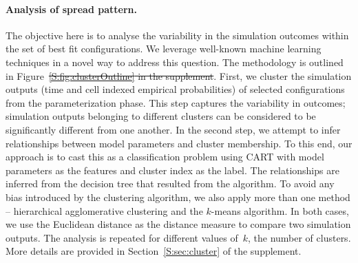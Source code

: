\documentclass[11pt]{article}
\theoremstyle{definition}
\providecommand{\DIFaddtex}[1]{{\protect\color{blue}\uwave{#1}}} %
\providecommand{\DIFdeltex}[1]{{\protect\color{red}\sout{#1}}}                      %
\providecommand{\DIFaddbegin}{} %
\providecommand{\DIFaddend}{} %
\providecommand{\DIFdelbegin}{} %
\providecommand{\DIFdelend}{} %
\providecommand{\DIFadd}[1]{\texorpdfstring{\DIFaddtex{#1}}{#1}} %
\providecommand{\DIFdel}[1]{\texorpdfstring{\DIFdeltex{#1}}{}} %
\newcommand{\DIFscaledelfig}{0.5}
\newlength{\DIFdelgraphicswidth} %
\newlength{\DIFdelgraphicsheight} %
\newcommand{\DIFaddincludegraphics}[2][]{{\color{blue}\fbox{\DIFOincludegraphics[#1]{#2}}}} %
\newcommand{\DIFdelincludegraphics}[2][]{%
\sbox{\DIFdelgraphicsbox}{\DIFOincludegraphics[#1]{#2}}%
\settoboxwidth{\DIFdelgraphicswidth}{\DIFdelgraphicsbox} %
\settoboxtotalheight{\DIFdelgraphicsheight}{\DIFdelgraphicsbox} %
\scalebox{\DIFscaledelfig}{%
\parbox[b]{\DIFdelgraphicswidth}{\usebox{\DIFdelgraphicsbox}\\[-\baselineskip] \rule{\DIFdelgraphicswidth}{0em}}\llap{\resizebox{\DIFdelgraphicswidth}{\DIFdelgraphicsheight}{%
\setlength{\unitlength}{\DIFdelgraphicswidth}%
\begin{picture}(1,1)%
\thicklines\linethickness{2pt} %
{\color[rgb]{1,0,0}\put(0,0){\framebox(1,1){}}}%
{\color[rgb]{1,0,0}\put(0,0){\line( 1,1){1}}}%
{\color[rgb]{1,0,0}\put(0,1){\line(1,-1){1}}}%
\end{picture}%
}\hspace*{3pt}}} %
} %
\DeclareRobustCommand{\DIFaddbegin}{\DIFOaddbegin \let\includegraphics\DIFaddincludegraphics} %
\DeclareRobustCommand{\DIFaddend}{\DIFOaddend \let\includegraphics\DIFOincludegraphics} %
\DeclareRobustCommand{\DIFdelbegin}{\DIFOdelbegin \let\includegraphics\DIFdelincludegraphics} %
\DeclareRobustCommand{\DIFdelend}{\DIFOaddend \let\includegraphics\DIFOincludegraphics} %
\begin{document}

\paragraph{Analysis of spread pattern.} The objective here is to analyse
the variability in the simulation outcomes within the set of best fit
configurations. We leverage well-known machine learning techniques in a
novel way to address this question. The methodology is outlined in
Figure~\DIFdelbegin \DIFdel{\ref{S:fig:clusterOutline} in the supplement}\DIFdelend \DIFaddbegin \DIFadd{\ref{fig:clusterOutline}}\DIFaddend . First, we cluster the simulation outputs
(time and cell indexed empirical probabilities) of selected configurations
from the parameterization phase. This step captures the variability in
outcomes; simulation outputs belonging to different clusters can be
considered to be significantly different from one another.  In the second
step, we attempt to infer relationships between model parameters and
cluster membership. To this end, our approach is to cast this as a
classification problem using CART with model parameters as the features and
cluster index as the label. The relationships are inferred from the
decision tree that resulted from the algorithm.  To avoid any bias
introduced by the clustering algorithm, we also apply more than one method
-- hierarchical agglomerative clustering and the $k$-means algorithm. In
both cases, we use the Euclidean distance as the distance measure to
compare two simulation outputs. The analysis is repeated for different
values of~$k$, the number of clusters.  More details are provided in
Section~\ref{S:sec:cluster} of the supplement. 
\DIFaddbegin 
\end{document}
